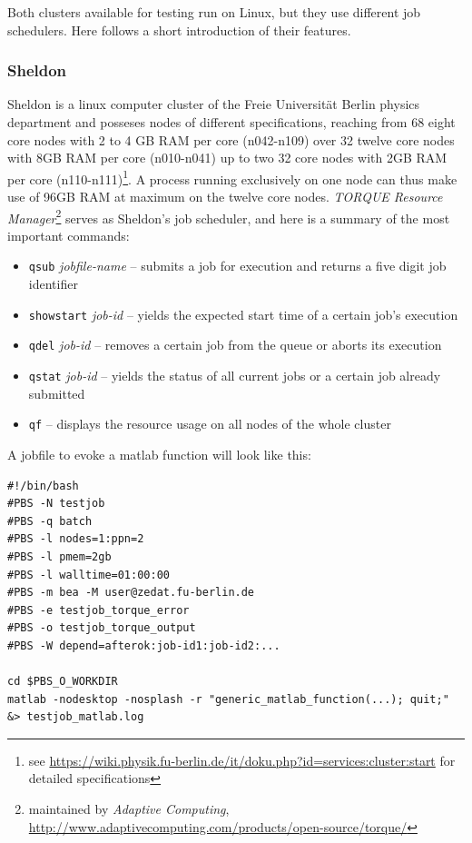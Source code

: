 \documentclass[11.5pt,a4paper]{article}
\begin{document}
Both clusters available for testing run on Linux, but they use different job schedulers. Here follows a short introduction of their features. 
\subsubsection{Sheldon}
\label{sec-sheldon}
Sheldon is a linux computer cluster of the Freie Universit\"at Berlin physics department and posseses nodes of different specifications, reaching from 68 eight core nodes with 2 to 4 GB RAM per core (n042-n109) over 32 twelve core nodes with 8GB RAM per core (n010-n041) up to two 32 core nodes with 2GB RAM per core (n110-n111)\footnote{see \url{https://wiki.physik.fu-berlin.de/it/doku.php?id=services:cluster:start} for detailed specifications}. A process running exclusively on one node can thus make use of 96GB RAM at maximum on the twelve core nodes. \emph{TORQUE Resource Manager}\footnote{maintained by \emph{Adaptive Computing}, \url{http://www.adaptivecomputing.com/products/open-source/torque/}} serves as Sheldon's job scheduler, and here is a summary of the most important commands:
\begin{itemize}
 \item \verb$qsub$ \emph{jobfile-name} -- submits a job for execution and returns a five digit job identifier
  \item \verb$showstart$ \emph{job-id} -- yields the expected start time of a certain job's execution
  \item \verb$qdel$ \emph{job-id} -- removes a certain job from the queue or aborts its execution
  \item \verb$qstat$ {\emph{job-id}} -- yields the status of all current jobs {or a certain job already submitted}
  \item \verb$qf$ -- displays the resource usage on all nodes of the whole cluster
\end{itemize}
A jobfile to evoke a matlab function will look like this:
\begin{lstlisting}
#!/bin/bash
#PBS -N testjob
#PBS -q batch
#PBS -l nodes=1:ppn=2
#PBS -l pmem=2gb
#PBS -l walltime=01:00:00
#PBS -m bea -M user@zedat.fu-berlin.de
#PBS -e testjob_torque_error
#PBS -o testjob_torque_output
#PBS -W depend=afterok:job-id1:job-id2:...

cd $PBS_O_WORKDIR
matlab -nodesktop -nosplash -r "generic_matlab_function(...); quit;" &> testjob_matlab.log
\end{lstlisting}
\end{document}
